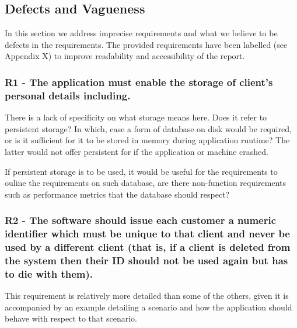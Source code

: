 


\subsection{Defects and Vagueness}

In this section we address imprecise requirements and what we believe to be defects in the requirements. The provided requirements have been labelled (see Appendix X) to improve readability and accessibility of the report. 

\subsubsection{ R1 - The application must enable the storage of client’s personal details including. }

There is a lack of specificity on what storage means here. Does it refer to persistent storage? In which, case a form of database on disk would be required, or is it sufficient for it to be stored in memory during application runtime? The latter would not offer persistent for if the application or machine crashed.  

If persistent storage is to be used, it would be useful for the requirements to ouline the requirements on such database, are there non-function requirements such as performance metrics that the database should respect? 

\subsubsection{R2 - The software should issue each customer a numeric identifier which must be unique to that client and never be used by a different client (that is, if a client is deleted from the system then their ID should not be used again but has to die with them). }

This requirement is relatively more detailed than some of the others, given it is accompanied by an example detailing a scenario and how the application should behave with respect to that scenario. 

